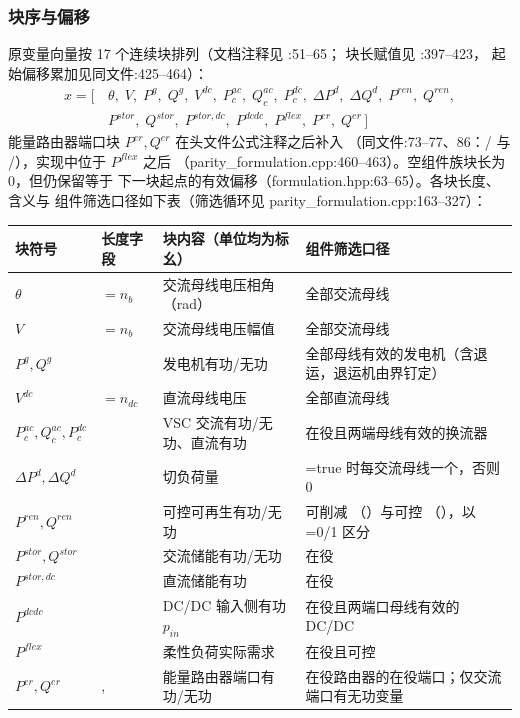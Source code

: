 \subsubsection*{块序与偏移}
原变量向量按 17 个连续块排列（文档注释见
:51--65；
块长赋值见 :397--423，
起始偏移累加见同文件:425--464）：
\begin{align*}
x = [\,&\theta,\; V,\; P^g,\; Q^g,\; V^{dc},\; P^{ac}_c,\; Q^{ac}_c,\; P^{dc}_c,\;
\Delta P^d,\; \Delta Q^d,\; P^{ren},\; Q^{ren},\\
&P^{stor},\; Q^{stor},\; P^{stor,dc},\; P^{dcdc},\; P^{flex},\; P^{er},\; Q^{er}\,]
\end{align*}
能量路由器端口块 $P^{er},Q^{er}$ 在头文件公式注释之后补入
（同文件:73--77、86：/ 与
/），实现中位于 $P^{flex}$ 之后
（parity\_formulation.cpp:460--463）。空组件族块长为 0，但仍保留等于
下一块起点的有效偏移（formulation.hpp:63--65）。各块长度、含义与
组件筛选口径如下表（筛选循环见 parity\_formulation.cpp:163--327）：

\begin{center}
\footnotesize
\begin{tabular}{@{}l l L{4.6cm} L{6.2cm}@{}}
\toprule
块符号 & 长度字段 & 块内容（单位均为标幺） & 组件筛选口径\\
\midrule
$\theta$ & $=n_b$ & 交流母线电压相角（rad） & 全部交流母线\\
$V$ & $=n_b$ & 交流母线电压幅值 & 全部交流母线\\
$P^g,Q^g$ &  & 发电机有功/无功 & 全部母线有效的发电机（含退运，退运机由界钉定）\\
$V^{dc}$ & $=n_{dc}$ & 直流母线电压 & 全部直流母线\\
$P^{ac}_c,Q^{ac}_c,P^{dc}_c$ &  & VSC 交流有功/无功、直流有功 & 在役且两端母线有效的换流器\\
$\Delta P^d,\Delta Q^d$ &  & 切负荷量 & =true 时每交流母线一个，否则 0\\
$P^{ren},Q^{ren}$ &  & 可控可再生有功/无功 & 可削减 （）与可控 （），以 =0/1 区分\\
$P^{stor},Q^{stor}$ &  & 交流储能有功/无功 & 在役 \\
$P^{stor,dc}$ &  & 直流储能有功 & 在役 \\
$P^{dcdc}$ &  & DC/DC 输入侧有功 $p_{in}$ & 在役且两端口母线有效的 DC/DC\\
$P^{flex}$ &  & 柔性负荷实际需求 & 在役且可控 \\
$P^{er},Q^{er}$ & , & 能量路由器端口有功/无功 & 在役路由器的在役端口；仅交流端口有无功变量\\
\bottomrule
\end{tabular}
\end{center}

